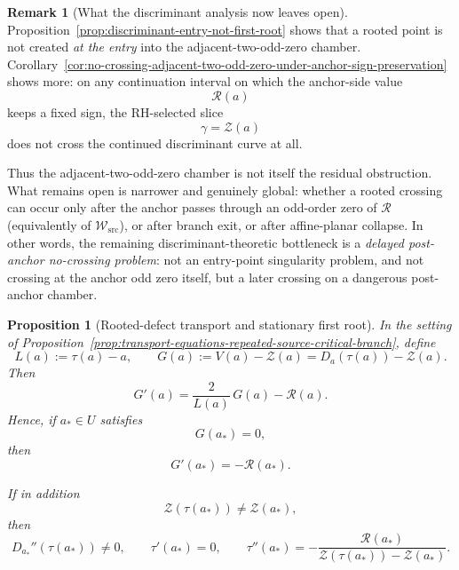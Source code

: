 \documentclass[11pt,a4paper]{amsart}
\theoremstyle{plain}
\newtheorem{proposition}[theorem]{Proposition}
\theoremstyle{definition}
\newtheorem{remark}[theorem]{Remark}
\begin{document}
\begin{remark}[What the discriminant analysis now leaves open]
\label{rem:what-discriminant-adjacent-odd-zero-analysis-still-leaves-open}
Proposition~\ref{prop:discriminant-entry-not-first-root} shows that a rooted
point is not created \emph{at the entry} into the adjacent-two-odd-zero chamber.
Corollary~\ref{cor:no-crossing-adjacent-two-odd-zero-under-anchor-sign-preservation}
shows more: on any continuation interval on which the anchor-side value
\[
\mathcal R(a)
\]
keeps a fixed sign, the RH-selected slice
\[
\gamma=\mathcal Z(a)
\]
does not cross the continued discriminant curve at all.

Thus the adjacent-two-odd-zero chamber is not itself the residual obstruction.
What remains open is narrower and genuinely global: whether a rooted crossing
can occur only after the anchor passes through an odd-order zero of
$\mathcal R$ (equivalently of $\mathcal W_{\mathrm{src}}$), or after branch
exit, or after affine-planar collapse. In other words, the remaining discriminant-theoretic bottleneck is a
\emph{delayed post-anchor no-crossing problem}: not an entry-point singularity
problem, and not crossing at the anchor odd zero itself, but a later crossing on
a dangerous post-anchor chamber.
\end{remark}

\begin{proposition}[Rooted-defect transport and stationary first root]
\label{prop:rooted-defect-transport-stationary-first-root}
In the setting of
Proposition~\ref{prop:transport-equations-repeated-source-critical-branch},
define
\[
L(a):=\tau(a)-a,
\qquad
G(a):=V(a)-\mathcal Z(a)=D_a(\tau(a))-\mathcal Z(a).
\]
Then
\[
G'(a)=\frac{2}{L(a)}\,G(a)-\mathcal R(a).
\]
Hence, if $a_*\in U$ satisfies
\[
G(a_*)=0,
\]
then
\[
G'(a_*)=-\mathcal R(a_*).
\]

If in addition
\[
\mathcal Z(\tau(a_*))\neq \mathcal Z(a_*),
\]
then
\[
D_{a_*}''(\tau(a_*))\neq 0,
\qquad
\tau'(a_*)=0,
\qquad
\tau''(a_*)=
-\frac{\mathcal R(a_*)}{\mathcal Z(\tau(a_*))-\mathcal Z(a_*)}.
\]
\end{proposition}
\end{document}
